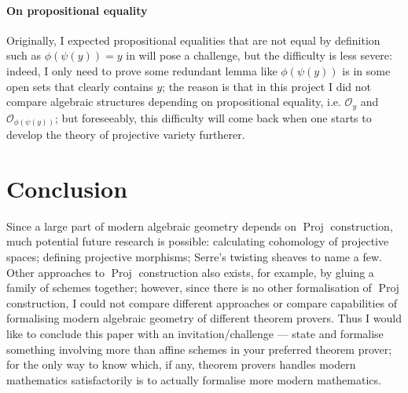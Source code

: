 \documentclass[a4paper,UKenglish,cleveref, autoref, thm-restate]{lipics-v2021}
\begin{document}
\paragraph*{On propositional equality}
Originally, I expected propositional equalities that are not equal by definition such as $\phi(\psi(y)) = y$ in  will pose a challenge, but the difficulty is less severe: indeed, I only need to prove some redundant lemma like $\phi(\psi(y))$ is in some open sets that clearly contains $y$; the reason is that in this project I did not compare algebraic structures depending on propositional equality, i.e. $\mathcal{O}_{y}$ and $\mathcal{O}_{\phi(\psi(y))}$; but foreseeably, this difficulty will come back when one starts to develop the theory of projective variety furtherer.

\section{Conclusion} 

Since a large part of modern algebraic geometry depends on $\operatorname{Proj}$ construction, much potential future research is possible: calculating cohomology of projective spaces; defining projective morphisms; Serre's twisting sheaves to name a few. Other approaches to $\operatorname{Proj}$ construction also exists, for example, by gluing a family of schemes together; however, since there is no other formalisation of $\operatorname{Proj}$ construction, I could not compare different approaches or compare capabilities of formalising modern algebraic geometry of different theorem provers. Thus I would like to conclude this paper with an invitation/challenge --- state and formalise something involving more than affine schemes in your preferred theorem prover; for the only way to know which, if any, theorem provers handles modern mathematics satisfactorily is to actually formalise more modern mathematics.


\end{document}
